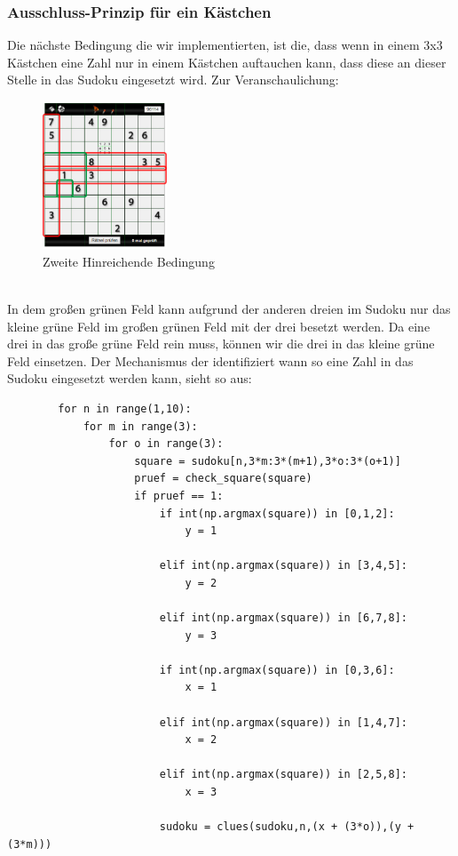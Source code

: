 \documentclass[11pt,a4paper]{article}
\begin{document}
\subsubsection{Ausschluss-Prinzip für ein Kästchen}
Die nächste Bedingung die wir implementierten, ist die, dass wenn in einem 3x3 Kästchen eine Zahl nur in einem Kästchen auftauchen kann, dass diese an dieser Stelle in das Sudoku eingesetzt wird. Zur Veranschaulichung: 
\ \\
\begin{figure}[htbp!]
\begin{center}
\includegraphics[width=0.33\textwidth]{sudoku3.pdf}
\end{center}
\caption{Zweite Hinreichende Bedingung}
\end{figure}
\ \\ 
In dem großen grünen Feld kann aufgrund der anderen dreien im Sudoku nur das kleine grüne Feld im großen grünen Feld mit der drei besetzt werden. Da eine drei in das große grüne Feld rein muss, können wir die drei in das kleine grüne Feld einsetzen. Der Mechanismus der identifiziert wann so eine Zahl in das Sudoku eingesetzt werden kann, sieht so aus:
\ \\
\begin{verbatim}
        for n in range(1,10):
            for m in range(3):       
                for o in range(3):   
                    square = sudoku[n,3*m:3*(m+1),3*o:3*(o+1)]    
                    pruef = check_square(square)                  
                    if pruef == 1:                           
                        if int(np.argmax(square)) in [0,1,2]:
                            y = 1
                        
                        elif int(np.argmax(square)) in [3,4,5]:
                            y = 2
                        
                        elif int(np.argmax(square)) in [6,7,8]:
                            y = 3
                    
                        if int(np.argmax(square)) in [0,3,6]:
                            x = 1
                        
                        elif int(np.argmax(square)) in [1,4,7]:
                            x = 2
                    
                        elif int(np.argmax(square)) in [2,5,8]:
                            x = 3
                        
                        sudoku = clues(sudoku,n,(x + (3*o)),(y + (3*m)))                        
\end{verbatim}
\end{document}
